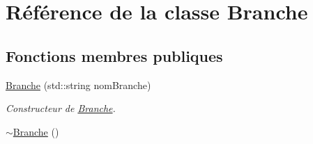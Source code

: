\hypertarget{classBranche}{\section{Référence de la classe Branche}
\label{classBranche}
}
\subsection*{Fonctions membres publiques}
\begin{DoxyCompactItemize}
\item 
\hyperlink{classBranche_ac81645afe3794d8d3ee7a4726a8668bc}{Branche} (std\-::string nom\-Branche)
\begin{DoxyCompactList}\small\item\em Constructeur de \hyperlink{classBranche}{Branche}. \end{DoxyCompactList}\item 
\hypertarget{classBranche_a67d42a894f0f13f73c0c0bca1dec77cf}{\hyperlink{classBranche_a67d42a894f0f13f73c0c0bca1dec77cf}{$\sim$\-Branche} ()}\label{classBranche_a67d42a894f0f13f73c0c0bca1dec77cf}


\end{DoxyCompactItemize}
